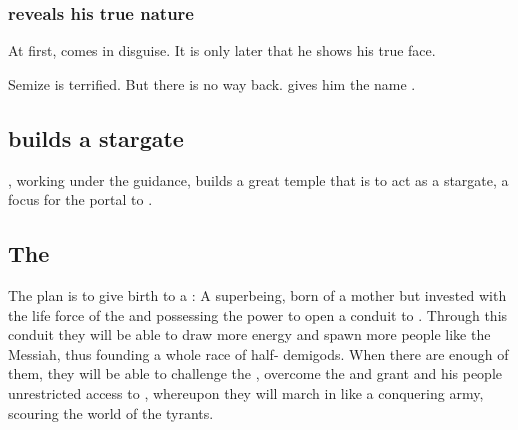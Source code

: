 \subsubsection{\Daggerrain{} reveals his true nature}

At first, \Daggerrain{} comes in disguise. 
It is only later that he shows \Semiza{} his true face.


Semize is terrified. 
But there is no way back. 
\Semiza{} gives him the name \quo{\Daggerrain}. 










\subsection[{Semiza builds a stargate}]{\Semiza builds a stargate}
\Semiza{}, working under the \psp{\banelords}{} guidance, builds a great temple that is to act as a stargate, a focus for the portal to \Erebos. 









\subsection{The \banemessiah}
The plan is to give birth to a \quo{\banemessiah}: A superbeing, born of a \nephilic{} mother but invested with the life force of the \banes{} and possessing the power to open a conduit to \Erebos{}. Through this conduit they will be able to draw more energy and spawn more people like the Messiah, thus founding a whole race of half-\bane{} demigods. 
When there are enough of them, they will be able to challenge the \dragons, overcome the  and grant \Daggerrain{} and his people unrestricted access to \Miith{}, whereupon they will march in like a conquering army, scouring the world of the \draconian{} tyrants. 

